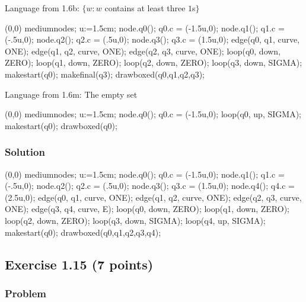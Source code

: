 \documentclass{article}
\begin{document}
\begin{empfile}
\begin{itemize}
Language from 1.6b: $\{w:w$ contains at least three $1$s$\}$

	\begin{center}
	\begin{emp}(0,0)
	mediumnodes;
	u:=1.5cm;
	node.q0(); q0.c = (-1.5u,0);
	node.q1(); q1.c = (-.5u,0);
	node.q2(); q2.c = (.5u,0);
	node.q3(); q3.c = (1.5u,0);
	edge(q0, q1, curve, ONE);
	edge(q1, q2, curve, ONE);
	edge(q2, q3, curve, ONE);
	loop(q0, down, ZERO);
	loop(q1, down, ZERO);
	loop(q2, down, ZERO);
	loop(q3, down, SIGMA);
	makestart(q0);
	makefinal(q3);
	drawboxed(q0,q1,q2,q3);
	\end{emp}
	\end{center}

Language from 1.6m: The empty set

	\begin{center}
	\begin{emp}(0,0)
	mediumnodes;
	u:=1.5cm;
	node.q0(); q0.c = (-1.5u,0);
	loop(q0, up, SIGMA);
	makestart(q0);
	drawboxed(q0);
	\end{emp}
	\end{center}
	
\end{itemize}

\subsubsection*{Solution}

	\begin{center}
	\begin{emp}(0,0)
	mediumnodes;
	u:=1.5cm;
	node.q0(); q0.c = (-1.5u,0);
	node.q1(); q1.c = (-.5u,0);
	node.q2(); q2.c = (.5u,0);
	node.q3(); q3.c = (1.5u,0);
	node.q4(); q4.c = (2.5u,0);
	edge(q0, q1, curve, ONE);
	edge(q1, q2, curve, ONE);
	edge(q2, q3, curve, ONE);
	edge(q3, q4, curve, E);
	loop(q0, down, ZERO);
	loop(q1, down, ZERO);
	loop(q2, down, ZERO);
	loop(q3, down, SIGMA);
	loop(q4, up, SIGMA);
	makestart(q0);
	drawboxed(q0,q1,q2,q3,q4);
	\end{emp}
	\end{center}

\newpage

\subsection*{Exercise 1.15 (7 points)}

\subsubsection*{Problem}


\end{empfile}
\end{document}
